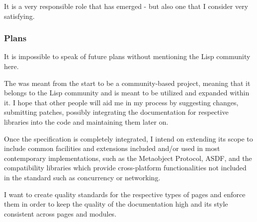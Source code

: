 It is a very responsible role that has emerged - but also one that I consider very satisfying.

\subsubsection{Plans}

It is impossible to speak of future plans without mentioning the Lisp community here.

The \cl{} \us{} was meant from the start to be a community-based project, meaning that it belongs to the Lisp community and is meant to be utilized and expanded within it. I hope that other people will aid me in my process by suggesting changes, submitting patches, possibly integrating the documentation for respective \cl{} libraries into the code and maintaining them later on.

Once the specification is completely integrated, I intend on extending its scope to include common facilities and extensions included and/or used in most contemporary \cl{} implementations, such as the Metaobject Protocol, ASDF, \ql{} and the compatibility libraries which provide cross-platform functionalities not included in the standard such as concurrency or networking.

I want to create quality standards for the respective types of pages and enforce them in order to keep the quality of the documentation high and its style consistent across pages and modules.